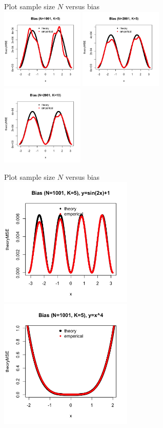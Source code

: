 \documentclass{article}
\begin{document}
\begin{itemize}
\begin{figure}[H]
Plot sample size $N$ versus bias\\
\includegraphics[width=1.55in]{pic/bias1.png}
\includegraphics[width=1.55in]{pic/bias2.png}
\includegraphics[width=1.55in]{pic/bias3.png}
\end{figure}

\begin{figure}[H]
Plot sample size $N$ versus bias\\
\includegraphics[width=2.5in]{pic/bias4.png}
\includegraphics[width=2.5in]{pic/bias5.png}
\end{figure}



\end{itemize}
\end{document}
